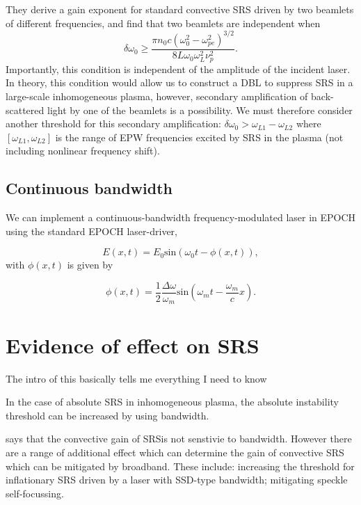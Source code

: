 They derive a gain exponent for standard convective SRS driven by two
beamlets of different frequencies, and find that two beamlets are independent
when
\begin{equation}\label{DLB_threshold_inhomo}
\delta \omega_{0} \geq \frac{\pi n_{0} c\left(\omega_{0}^{2}-\omega_{p
e}^{2}\right)^{3 / 2}}{8 L \omega_{0} \omega_{L}^{2} \nu_{p}^{2}}.
\end{equation}
Importantly, this condition is independent of the amplitude of the incident
laser. In theory, this condition would allow us to construct a DBL to suppress
SRS in a large-scale inhomogeneous plasma, however, secondary amplification of
back-scattered light by one of the beamlets is a possibility. We must therefore
consider another threshold for this secondary amplification: $\delta\omega_0 >
\omega_{L1}-\omega_{L2}$ where $[\omega_{L1},\omega_{L2}]$ is the range of EPW
frequencies excited by SRS in the plasma (not including nonlinear frequency
shift).



\subsection{Continuous bandwidth}
We can implement a continuous-bandwidth frequency-modulated laser in EPOCH using the standard EPOCH laser-driver,

\begin{equation}
 	 E(x,t) = E_0\text{sin}\left(\omega_0 t - \phi(x,t)\right),
\end{equation} with $\phi(x,t)$ is given by

\begin{equation}
	\phi(x,t) = \frac{1}{2}\frac{\Delta\omega}{\omega_m}\text{sin}	 	 \left(\omega_mt - \frac{\omega_m}{c}x\right).
\end{equation}

\section{Evidence of effect on SRS}
The intro of this basically tells me everything I need to know \citep{Follett2021}

In the case of absolute SRS in inhomogeneous plasma, the absolute instability threshold can be increased by using bandwidth.

\citet{Guzdar1991} says that the convective gain of SRSis not senstivie to bandwidth. However there are a range of additional effect which can determine the gain of convective SRS which can be mitigated by broadband. These include: increasing the threshold for inflationary SRS driven by a laser with SSD-type bandwidth; mitigating speckle self-focussing.

